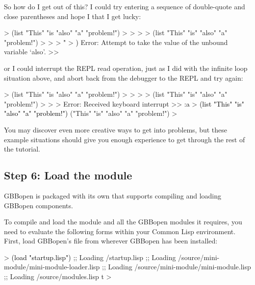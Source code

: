 \documentclass[10pt,twoside,english,pdftex]{article}
\begin{document}
So how do I get out of this?  I could try entering a sequence of double-quote
and close parentheses and hope I that I get lucky:
%
\begin{example}\color{darkergray}%
  > (list "This" "is "also" "a" "problem!")
  >
  >
  >
  > (list "This" "is" "also" "a" "problem!")
  >
  >
  > \textcolor{black}{"}
  > \textcolor{black}{)}
  Error: Attempt to take the value of the unbound variable `also'.
  >>
\end{example}
%
or I could interrupt the REPL read operation, just as I did with the infinite
loop situation above, and abort back from the debugger to the REPL and try
again:
%
\begin{example}\color{darkergray}%
  > (list "This" "is "also" "a" "problem!")
  >
  >
  >
  > (list "This" "is" "also" "a" "problem!")
  >
  >
  > \textcolor{black}{}
  Error: Received keyboard interrupt 
  >> \textcolor{black}{:a}
  > \textcolor{black}{(list "This" "is" "also" "a" "problem!")}
  ("This" "is" "also" "a" "problem!")
  >
\end{example}

You may discover even more creative ways to get into problems, but these
example situations should give you enough experience to get through the rest
of the tutorial.

\subsection*{Step 6: Load the  module}

%
GBBopen is packaged with its own 
that supports compiling and loading GBBopen components.

To compile and load the  module and all the GBBopen
modules it requires, you need to evaluate the following forms within your
Common Lisp environment.  First, load GBBopen's  file from
wherever GBBopen has been installed:
%
\begin{example}\color{darkergray}%
  > \textcolor{black}{(load "startup.lisp")}
  ;; Loading /startup.lisp
  ;;  Loading /source/mini-module/mini-module-loader.lisp
  ;;   Loading /source/mini-module/mini-module.lisp
  ;;  Loading /source/modules.lisp
  t
  >
\end{example}
\end{document}
